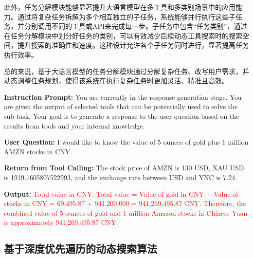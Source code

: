 此外，任务分解模块能够显著提升大语言模型在多工具和多类别场景中的应用能力。通过将复杂任务拆解为多个相互独立的子任务，系统能够并行执行这些子任务，并分别调用不同的工具或API来完成每一步。子任务中包含“任务类别”，通过在任务分解模块中划分好任务的类别，可以有效减少后续动态工具搜索时的搜索空间，提升搜索的准确性和速度。这种设计允许各个子任务同时进行，显著提高任务执行效率。

总的来说，基于大语言模型的任务分解模块通过分解复杂任务、改写用户需求，并动态调整任务规划，使得该系统在执行复杂任务时更加灵活、精准且高效。





\begin{center}
\begin{tcolorbox}[colback=bgcolor, colframe=black, width=0.8\textwidth, boxrule=0.5mm, 
coltitle=white, colbacktitle=titlecolor, title=An Example for Response Generation with GPT-4]


\textbf{Instruction Prompt:} You are currently in the response generation stage. You are given the output of selected tools that can be potentially used to solve the sub-task. Your goal is to generate a response to the user question based on the results from tools and your internal knowledge.

\textbf{User Question:} I would like to know the value of 5 ounces of gold plus 1 million AMZN stocks in CNY.

\textbf{Return from Tool Calling:} The stock price of AMZN is 130 USD, XAU USD is 1919.7605807522993, and the exchange rate between USD and YNC is 7.24.

\textbf{Output:} \textcolor{red}{Total value in CNY: Total value = Value of gold in CNY + Value of stocks in CNY = 69,495.87 + 941,200,000 = 941,269,495.87 CNY. Therefore, the combined value of 5 ounces of gold and 1 million Amazon stocks in Chinese Yuan is approximately 941,269,495.87 CNY.}

\end{tcolorbox}

\end{center}


\subsection{基于深度优先遍历的动态搜索算法}

